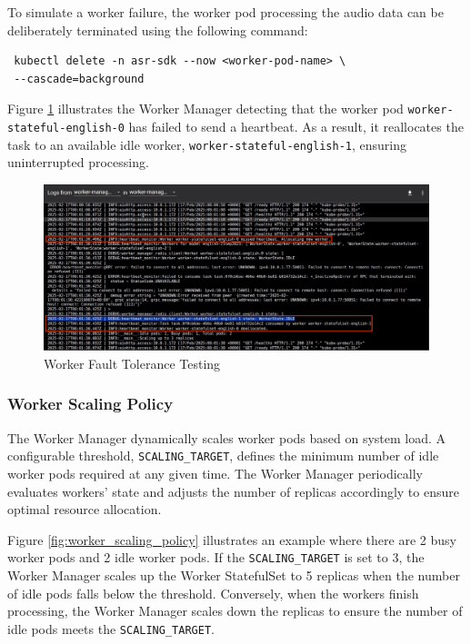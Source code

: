 To simulate a worker failure, the worker pod processing the audio data can be deliberately terminated using the following command:
\begin{verbatim}
 kubectl delete -n asr-sdk --now <worker-pod-name> \
 --cascade=background
\end{verbatim}

Figure \ref{fig:worker_fault_tolerance} illustrates the Worker Manager detecting that the worker pod \texttt{worker-\allowbreak stateful-english-0} has failed to send a heartbeat. As a result, it reallocates the task to an available idle worker, \texttt{worker-stateful-english-1}, ensuring uninterrupted processing.

\begin{figure}[H]
  \centering
  \includegraphics[width=\textwidth]{figures/worker_fault_tolerance.png}
  \caption{Worker Fault Tolerance Testing}
  \label{fig:worker_fault_tolerance}
\end{figure}

\subsubsection{Worker Scaling Policy}
The Worker Manager dynamically scales worker pods based on system load. A configurable threshold, \texttt{SCALING\_TARGET}, defines the minimum number of idle worker pods required at any given time. The Worker Manager periodically evaluates workers' state and adjusts the number of replicas accordingly to ensure optimal resource allocation.

Figure \ref{fig:worker_scaling_policy} illustrates an example where there are 2 busy worker pods and 2 idle worker pods. If the \texttt{SCALING\_TARGET} is set to 3, the Worker Manager scales up the Worker StatefulSet to 5 replicas when the number of idle pods falls below the threshold. Conversely, when the workers finish processing, the Worker Manager scales down the replicas to ensure the number of idle pods meets the \texttt{SCALING\_TARGET}.

